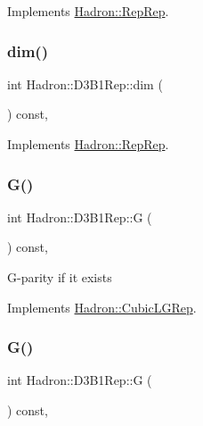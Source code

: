 Implements \mbox{\hyperlink{structHadron_1_1RepRep_a92c8802e5ed7afd7da43ccfd5b7cd92b}{Hadron\+::\+Rep\+Rep}}.

\mbox{\label{structHadron_1_1D3B1Rep_ae0ea1d6f2720000159957d1303038399}} 
\subsubsection{\texorpdfstring{dim()}{dim()}\hspace{0.1cm}{\footnotesize\ttfamily [3/3]}}
{\footnotesize\ttfamily int Hadron\+::\+D3\+B1\+Rep\+::dim (\begin{DoxyParamCaption}{ }\end{DoxyParamCaption}) const\hspace{0.3cm}{\ttfamily [inline]}, {\ttfamily [virtual]}}



Implements \mbox{\hyperlink{structHadron_1_1RepRep_a92c8802e5ed7afd7da43ccfd5b7cd92b}{Hadron\+::\+Rep\+Rep}}.

\mbox{\label{structHadron_1_1D3B1Rep_ab5d7b0b93b53bf87f919f365d0d8cc4e}} 
\subsubsection{\texorpdfstring{G()}{G()}\hspace{0.1cm}{\footnotesize\ttfamily [1/2]}}
{\footnotesize\ttfamily int Hadron\+::\+D3\+B1\+Rep\+::G (\begin{DoxyParamCaption}{ }\end{DoxyParamCaption}) const\hspace{0.3cm}{\ttfamily [inline]}, {\ttfamily [virtual]}}

G-\/parity if it exists 

Implements \mbox{\hyperlink{structHadron_1_1CubicLGRep_ace26f7b2d55e3a668a14cb9026da5231}{Hadron\+::\+Cubic\+L\+G\+Rep}}.

\mbox{\label{structHadron_1_1D3B1Rep_ab5d7b0b93b53bf87f919f365d0d8cc4e}} 
\subsubsection{\texorpdfstring{G()}{G()}\hspace{0.1cm}{\footnotesize\ttfamily [2/2]}}
{\footnotesize\ttfamily int Hadron\+::\+D3\+B1\+Rep\+::G (\begin{DoxyParamCaption}{ }\end{DoxyParamCaption}) const\hspace{0.3cm}{\ttfamily [inline]}, {\ttfamily [virtual]}}

